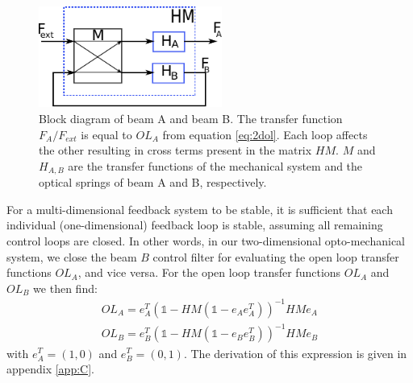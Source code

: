 \begin{figure}[htbp]
		\includegraphics[width=6cm]{./figures/block_mimo_paper.pdf}
	\caption{Block diagram of beam A and beam B. The transfer function $F_A/F_{ext}$ is equal to $OL_A$ from equation \ref{eq:2dol}. Each loop affects the other resulting in cross terms
	present in the matrix $HM$. $M$ and $H_{A,B}$ are the transfer functions of the mechanical system and the optical springs of beam A and B, respectively.}
	\label{fig:block_loops}
\end{figure}


For a multi-dimensional feedback system to be stable, it is sufficient that each individual (one-dimensional) feedback loop is stable, assuming all remaining control loops are closed. In other words, in our two-dimensional opto-mechanical system, we close the beam $B$ control filter for evaluating the open loop transfer functions $OL_{A}$, and vice versa. For the open loop transfer functions $OL_{A}$ and $OL_{B}$ we then find: 
\begin{eqnarray}
\label{eq:2dol}
OL_{A}=e_A^{T}\left(\mathds{1}-HM (\mathds{1} - e_A e_A^T) \right)^{-1}HMe_A  \\
OL_{B}=e_B^{T}\left(\mathds{1}-HM (\mathds{1} - e_B e_B^T) \right)^{-1}HMe_B \nonumber
\end{eqnarray}
with $e_A^T=(1,0)$ and $e_B^T=(0,1)$. The derivation of this expression is given in appendix \ref{app:C}.


